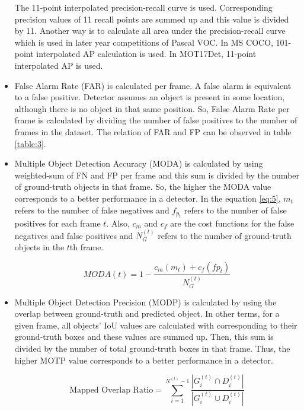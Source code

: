 \documentclass{article}
\begin{document}
\begin{itemize}
    The 11-point interpolated precision-recall curve is used. Corresponding precision values of 11 recall 
    points are summed up and this value is divided by 11. Another way is to calculate all area under 
    the precision-recall curve which is used in later year competitions of Pascal VOC. In MS COCO, 
    101-point interpolated AP calculation is used. In MOT17Det, 11-point interpolated AP is used.
    \item False Alarm Rate (FAR) is calculated per frame. A false alarm is equivalent to a false positive. 
    Detector assumes an object is present in some location, although there is no object in that same position. 
    So, False Alarm Rate per frame is calculated by dividing the number of false positives to the number of 
    frames in the dataset. The relation of FAR and FP can be observed in table \ref{table:3}.
    \item Multiple Object Detection Accuracy (MODA) \cite{mod} is calculated by using weighted-sum of FN and 
    FP per frame and this sum is divided by the number of ground-truth objects in that frame. So, the 
    higher the MODA value corresponds to a better performance in a detector. In the equation \ref{eq:5}, 
    $m_{t}$ refers to the number of false negatives and $f_{p_{t}}$ refers to the number of 
    false positives for each frame $t$. Also, $c_{m}$ and $c_{f}$ are the cost functions for the 
    false negatives and false positives and $N_{G}^{(t)}$ refers to the number of ground-truth 
    objects in the $t$th frame.
    
    \begin{equation} 
        \label{eq:5}
        M O D A(t)=1-\frac{c_{m}\left(m_{t}\right)+c_{f}\left(f p_{t}\right)}{N_{G}^{(t)}}
    \end{equation}

    \item Multiple Object Detection Precision (MODP) \cite{mod} is calculated by using the overlap between ground-truth 
    and predicted object. In other terms, for a given frame, all objects' IoU values are calculated with 
    corresponding to their ground-truth boxes and these values are summed up. Then, this sum is divided by 
    the number of total ground-truth boxes in that frame. Thus, the higher MOTP value corresponds to a better 
    performance in a detector. 
    
    \begin{equation} 
        \label{eq:6}
        \text {Mapped Overlap Ratio}=\sum_{i=1}^{N^{(t)}-1} \frac{\left|G_{i}^{(t)} \cap D_{i}^{(t)}\right|}{\left|G_{i}^{(t)} \cup D_{i}^{(t)}\right|}
    \end{equation}
    

\end{itemize}
\end{document}
